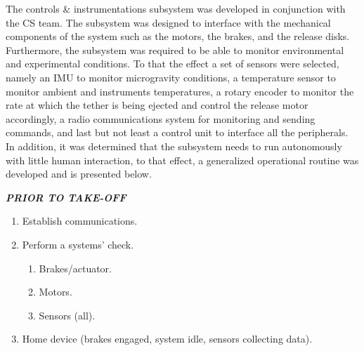
\indent\indent The controls \& instrumentations subsystem was developed in conjunction with the CS team. The subsystem was designed to interface with the mechanical components of the system such as the motors, the brakes, and the release disks. Furthermore, the subsystem was required to be able to monitor environmental and experimental conditions. To that the effect a set of sensors were selected, namely an IMU to monitor microgravity conditions, a temperature sensor to monitor ambient and instruments temperatures, a rotary encoder to monitor the rate at which the tether is being ejected and control the release motor accordingly, a radio communications system for monitoring and sending commands, and last but not least a control unit to interface all the peripherals.
In addition, it was determined that the subsystem needs to run autonomously with little human interaction, to that effect, a generalized operational routine was developed and is presented below. \newline

\noindent\textbf{\textit{PRIOR TO TAKE-OFF}}
\begin{enumerate}
    \item Establish communications.
    \item Perform a systems’ check.
    \begin{enumerate}[noitemsep, nolistsep, label*=\arabic*.]
        \item Brakes/actuator.
        \item Motors.
        \item Sensors (all).
    \end{enumerate}
    \item Home device (brakes engaged, system idle, sensors collecting data).
\end{enumerate}

\vspace{5mm}

